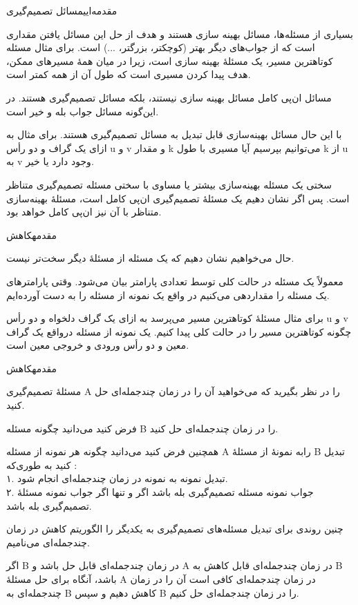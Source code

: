 \begin{itemframe-s}{مقدمه‌ایی}{مسائل تصمیم‌گیری}
\item[-]
بسیاری از مسئله‌ها، مسائل بهینه سازی
هستند و هدف از حل این مسائل یافتن مقداری است که از جواب‌های دیگر بهتر (کوچکتر، بزرگتر، ...) است. برای مثال مسئله کوتاهترین مسیر، یک مسئلهٔ بهینه سازی است، زیرا در میان همهٔ مسیرهای ممکن، هدف پیدا کردن مسیری است که طول آن از همه کمتر است.
\item[-]
مسائل ان‌پی کامل مسائل بهینه سازی نیستند، بلکه مسائل تصمیم‌گیری
هستند. در این‌گونه مسائل جواب بله و خیر است.
\item[-]
با این حال مسائل بهینه‌سازی قابل تبدیل به مسائل تصمیم‌گیری هستند. برای مثال به ازای یک گراف و دو رأس u و v و مقدار k می‌توانیم بپرسیم آیا مسیری با طول k از u به v وجود دارد یا خیر.
\item[-]
سختی یک مسئله بهینه‌سازی بیشتر یا مساوی با سختی مسئله تصمیم‌گیری متناظر است. پس اگر نشان دهیم یک مسئلهٔ تصمیم‌گیری ان‌پی کامل است، مسئلهٔ بهینه‌سازی متناظر با آن نیز ان‌پی کامل خواهد بود.
\end{itemframe-s}


\begin{itemframe-s}{مقدمه}{کاهش}
\item[-]
حال می‌خواهیم نشان دهیم که یک مسئله از مسئلهٔ دیگر سخت‌تر نیست.
\item[-]
معمولاً یک مسئله در حالت کلی توسط تعدادی پارامتر بیان می‌شود. وقتی پارامترهای یک مسئله را مقداردهی می‌کنیم در واقع یک نمونه
از مسئله را به دست آورده‌ایم.
\item[-]
برای مثال مسئلهٔ کوتاهترین مسیر می‌پرسد به ازای یک گراف دلخواه و دو رأس u و v چگونه کوتاهترین مسیر را در حالت کلی پیدا کنیم. یک نمونه از مسئله درواقع یک گراف معین و دو رأس ورودی و خروجی معین است.
\end{itemframe-s}


\begin{itemframe-s}{مقدمه}{کاهش}
\item[-]
مسئلهٔ تصمیم‌گیری A را در نظر بگیرید که می‌خواهید آن را در زمان چندجمله‌ای حل کنید.
\item[-]
فرض کنید می‌دانید چگونه مسئله B را در زمان چند‌جمله‌ای حل کنید.
\item[-]
همچنین فرض کنید می‌دانید چگونه هر نمونه
\m{\alpha}
از مسئله A رابه نمونهٔ
\m{\beta}
از مسئلهٔ B تبدیل کنید به طوری‌که :\\
۱. تبدیل نمونه
\m{\alpha}
به نمونه
\m{\beta}
در زمان چند‌جمله‌ای انجام شود.\\
۲. جواب نمونه مسئله تصمیم‌گیری
\m{\alpha}
بله باشد اگر و تنها اگر جواب نمونه مسئلهٔ تصمیم‌گیری
\m{\beta}
بله باشد.
\item[-]
چنین روندی برای تبدیل مسئله‌های تصمیم‌گیری به یکدیگر را الگوریتم کاهش در زمان چندجمله‌ای
می‌نامیم.
\item[-]
اگر B در زمان چندجمله‌ای قابل حل باشد و A در زمان چندجمله‌ای قابل کاهش به B باشد، آنگاه برای حل مسئلهٔ A در زمان چندجمله‌ای کافی است آن را در زمان چندجمله‌ای به B کاهش دهیم و سپس B را در زمان چندجمله‌ای حل کنیم.
\end{itemframe-s}


